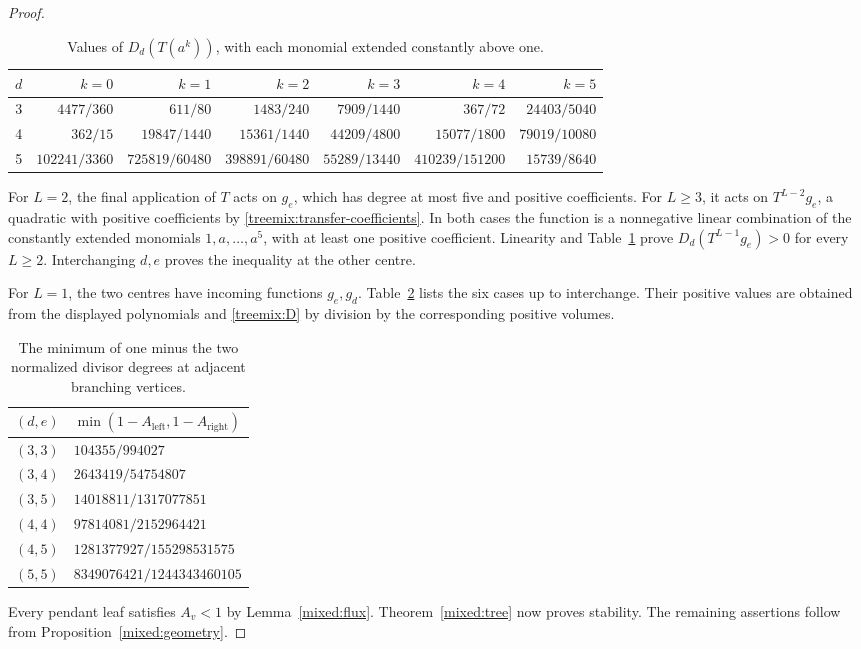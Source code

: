 \begin{proof}
\begin{table}[ht]
\centering
\caption{Values of $D_d(T(a^k))$, with each monomial extended constantly above one.}
\label{treemix:transfer-signs}
\begin{adjustbox}{max width=\textwidth,center}
\begin{tabular}{rrrrrrr}
\toprule
$d$ & $k=0$ & $k=1$ & $k=2$ & $k=3$ & $k=4$ & $k=5$\\
\midrule
3 & $4477/360$ & $611/80$ & $1483/240$ & $7909/1440$ & $367/72$ & $24403/5040$\\
4 & $362/15$ & $19847/1440$ & $15361/1440$ & $44209/4800$ & $15077/1800$ & $79019/10080$\\
5 & $102241/3360$ & $725819/60480$ & $398891/60480$ & $55289/13440$ & $410239/151200$ & $15739/8640$\\
\bottomrule
\end{tabular}
\end{adjustbox}
\end{table}

For $L=2$, the final application of $T$ acts on $g_e$, which has
degree at most five and positive coefficients. For $L\ge3$, it acts
on $T^{L-2}g_e$, a quadratic with positive coefficients by
\eqref{treemix:transfer-coefficients}. In both cases the function is a
nonnegative linear combination of the constantly extended monomials
$1,a,\ldots,a^5$, with at least one positive coefficient.
Linearity and Table~\ref{treemix:transfer-signs} prove
$D_d(T^{L-1}g_e)>0$ for every $L\ge2$. Interchanging $d,e$ proves the
inequality at the other centre.

For $L=1$, the two centres have incoming functions $g_e,g_d$.
Table~\ref{treemix:adjacent-signs} lists the six cases up to interchange.
Their positive values are obtained from the displayed polynomials and
\eqref{treemix:D} by division by the corresponding positive volumes.
\begin{table}[ht]
\centering
\caption{The minimum of one minus the two normalized divisor degrees at adjacent branching vertices.}
\label{treemix:adjacent-signs}
\begin{adjustbox}{max width=\textwidth,center}
\begin{tabular}{cl}
\toprule
$(d,e)$ & $\min(1-A_{\mathrm{left}},1-A_{\mathrm{right}})$\\
\midrule
$(3,3)$ & $104355/994027$\\
$(3,4)$ & $2643419/54754807$\\
$(3,5)$ & $14018811/1317077851$\\
$(4,4)$ & $97814081/2152964421$\\
$(4,5)$ & $1281377927/155298531575$\\
$(5,5)$ & $8349076421/1244343460105$\\
\bottomrule
\end{tabular}
\end{adjustbox}
\end{table}

Every pendant leaf satisfies $A_v<1$ by Lemma~\ref{mixed:flux}.
Theorem~\ref{mixed:tree} now proves stability. The remaining assertions
follow from Proposition~\ref{mixed:geometry}.
\end{proof}
